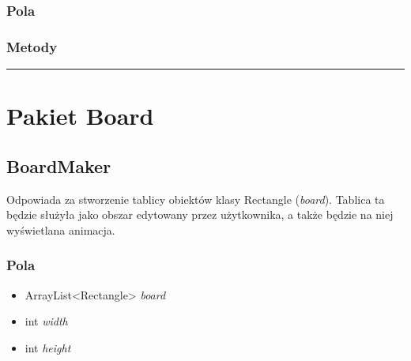 \documentclass[a4paper,11pt]{article}
\newcommand{\linia}{\rule{\linewidth}{0.4mm}}
\begin{document}
\subsubsection{Pola}

\subsubsection{Metody}



\noindent\linia

\section{Pakiet Board}

\subsection{BoardMaker}
Odpowiada za stworzenie tablicy obiektów klasy Rectangle (\textit{board}). Tablica ta będzie służyła jako obszar edytowany przez użytkownika, a także będzie na niej wyświetlana animacja.
\subsubsection{Pola}
\begin{itemize}
\item ArrayList<Rectangle> \textit{board}
\item int \textit{width}
\item int \textit{height}
\end{itemize}
\end{document}
